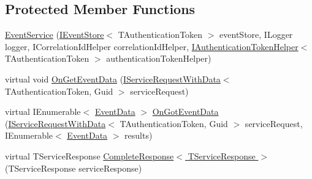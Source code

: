 \subsection*{Protected Member Functions}
\begin{DoxyCompactItemize}
\item 
\hyperlink{classCqrs_1_1Services_1_1EventService_ac5896c2eb4efbdb42b3cad774b688e45_ac5896c2eb4efbdb42b3cad774b688e45}{Event\+Service} (\hyperlink{interfaceCqrs_1_1Events_1_1IEventStore}{I\+Event\+Store}$<$ T\+Authentication\+Token $>$ event\+Store, I\+Logger logger, I\+Correlation\+Id\+Helper correlation\+Id\+Helper, \hyperlink{interfaceCqrs_1_1Authentication_1_1IAuthenticationTokenHelper}{I\+Authentication\+Token\+Helper}$<$ T\+Authentication\+Token $>$ authentication\+Token\+Helper)
\item 
virtual void \hyperlink{classCqrs_1_1Services_1_1EventService_a1556310c97fbf05df7804d53f91f8511_a1556310c97fbf05df7804d53f91f8511}{On\+Get\+Event\+Data} (\hyperlink{interfaceCqrs_1_1Services_1_1IServiceRequestWithData}{I\+Service\+Request\+With\+Data}$<$ T\+Authentication\+Token, Guid $>$ service\+Request)
\item 
virtual I\+Enumerable$<$ \hyperlink{classCqrs_1_1Events_1_1EventData}{Event\+Data} $>$ \hyperlink{classCqrs_1_1Services_1_1EventService_a16030e800b05cea77fd2183db7296804_a16030e800b05cea77fd2183db7296804}{On\+Got\+Event\+Data} (\hyperlink{interfaceCqrs_1_1Services_1_1IServiceRequestWithData}{I\+Service\+Request\+With\+Data}$<$ T\+Authentication\+Token, Guid $>$ service\+Request, I\+Enumerable$<$ \hyperlink{classCqrs_1_1Events_1_1EventData}{Event\+Data} $>$ results)
\item 
virtual T\+Service\+Response \hyperlink{classCqrs_1_1Services_1_1EventService_aef315bb1094123bb9b4ab7bd7be9392b_aef315bb1094123bb9b4ab7bd7be9392b}{Complete\+Response$<$ T\+Service\+Response $>$} (T\+Service\+Response service\+Response)
\end{DoxyCompactItemize}
